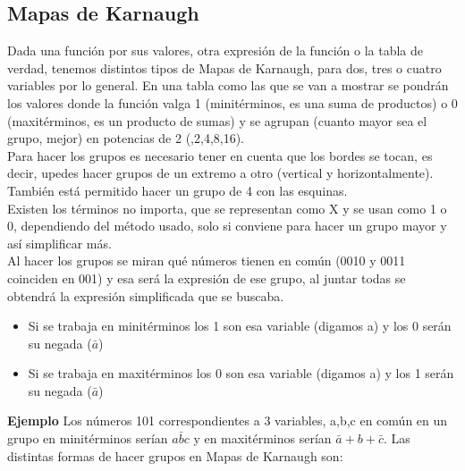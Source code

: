 \documentclass[a4paper]{article}
\theoremstyle{plain} \newtheorem{PrimerPrincipio}{Teorema}
\theoremstyle{plain} \newtheorem{SegundoPrincipio}{Teorema}
\begin{document}
\subsection{Mapas de Karnaugh}
Dada una función por sus valores, otra expresión de la función o la tabla de verdad, tenemos distintos tipos de Mapas de Karnaugh, para dos, tres o cuatro variables por lo general.
En una tabla como las que se van a mostrar se pondrán los valores donde la función valga 1 (minitérminos, es una suma de productos) o 0 (maxitérminos, es un producto de sumas) y se agrupan (cuanto mayor sea el grupo, mejor) en potencias de 2 (,2,4,8,16).\\
Para hacer los grupos es necesario tener en cuenta que los bordes se tocan, es decir, upedes hacer grupos de un extremo a otro (vertical y horizontalmente). También está permitido hacer un grupo de 4 con las esquinas.\\
Existen los términos no importa, que se representan como X y se usan como 1 o 0, dependiendo del método usado, solo si conviene para hacer un grupo mayor y así simplificar más.\\
Al hacer los grupos se miran qué números tienen en común (0010 y 0011 coinciden en 001) y esa será la expresión de ese grupo, al juntar todas se obtendrá la expresión simplificada que se buscaba.
\begin{itemize}
\item Si se trabaja en minitérminos los 1 son esa variable (digamos a) y los 0 serán su negada ($\bar{a}$)
\item Si se trabaja en maxitérminos los 0 son esa variable (digamos a) y los 1 serán su negada ($\bar{a}$)
\end{itemize} 
\large{\textbf{Ejemplo}}
Los números 101 correspondientes a 3 variables, a,b,c en común en un grupo en minitérminos serían $a\bar{b}c$ y en maxitérminos serían $\bar{a}+b+\bar{c}$.
\vspace{0.5cm}
Las distintas formas de hacer grupos en Mapas de Karnaugh son:
\end{document}
